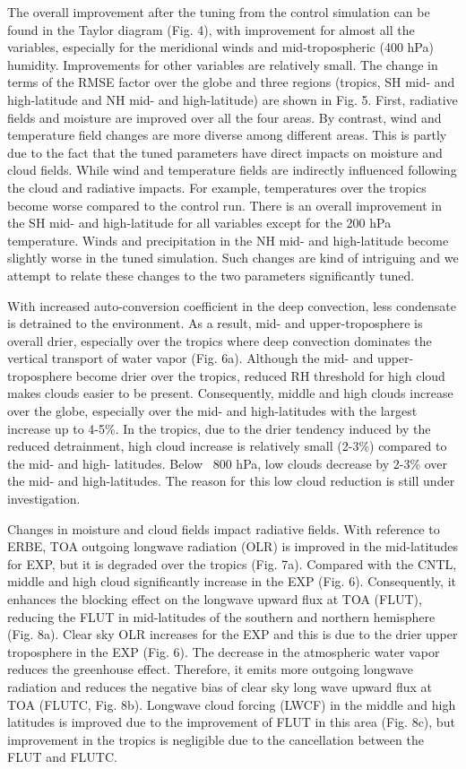 \documentclass[gmd, manuscript]{copernicus}
\begin{document}
The overall improvement after the tuning from the control simulation can be found in the Taylor diagram (Fig. 4), with improvement for almost all the variables, especially for the meridional winds and mid-tropospheric (400 hPa) humidity. Improvements for other variables are relatively small. The change in terms of the RMSE factor over the globe and three regions (tropics, SH mid- and high-latitude and NH mid- and high-latitude) are shown in Fig. 5. First, radiative fields and moisture are improved over all the four areas. By contrast, wind and temperature field changes are more diverse among different areas. This is partly due to the fact that the tuned parameters have direct impacts on moisture and cloud fields. While wind and temperature fields are indirectly influenced following the cloud and radiative impacts. For example, temperatures over the tropics become worse compared to the control run. There is an overall improvement in the SH mid- and high-latitude for all variables except for the 200 hPa temperature. Winds and precipitation in the NH mid- and high-latitude become slightly worse in the tuned simulation. Such changes are kind of intriguing and we attempt to relate these changes to the two parameters significantly tuned.


With increased auto-conversion coefficient in the deep convection, less condensate is detrained to the environment. As a result, mid- and upper-troposphere is overall drier, especially over the tropics where deep convection dominates the vertical transport of water vapor (Fig. 6a).  Although the mid- and upper-troposphere become drier over the tropics, reduced RH threshold for high cloud makes clouds easier to be present. Consequently, middle and high clouds increase over the globe, especially over the mid- and high-latitudes with the largest increase up to 4-5\%. In the tropics, due to the drier tendency induced by the reduced detrainment, high cloud increase is relatively small (2-3\%) compared to the mid- and high- latitudes. Below ~800 hPa, low clouds decrease by 2-3\% over the mid- and high-latitudes. The reason for this low cloud reduction is still under investigation. 


Changes in moisture and cloud fields impact radiative fields.  With reference to ERBE, TOA outgoing longwave radiation (OLR) is improved in the mid-latitudes for EXP, but it is degraded over the tropics (Fig. 7a). Compared with the CNTL, middle and high cloud significantly increase in the EXP (Fig. 6). Consequently, it enhances the blocking effect on the longwave upward flux at TOA (FLUT), reducing the FLUT in mid-latitudes of the southern and northern hemisphere (Fig. 8a). Clear sky OLR increases for the EXP and this is due to the drier upper troposphere in the EXP (Fig. 6). The decrease in the atmospheric water vapor reduces the greenhouse effect. Therefore, it emits more outgoing longwave radiation and reduces the negative bias of clear sky long wave upward flux at TOA (FLUTC, Fig. 8b). Longwave cloud forcing (LWCF) in the middle and high latitudes is improved due to the improvement of FLUT in this area (Fig. 8c), but improvement in the tropics is negligible due to the cancellation between the FLUT and FLUTC. 
\end{document}
